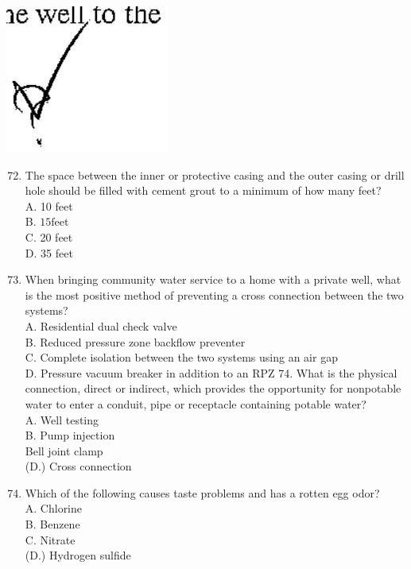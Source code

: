 \documentclass[10pt]{article}
\begin{document}
\includegraphics[max width=\textwidth]{2022_11_11_6852287475e47d0e3aceg-10}

\begin{enumerate}
  \setcounter{enumi}{71}
  \item The space between the inner or protective casing and the outer casing or drill hole should be filled with cement grout to a minimum of how many feet?\\
A. 10 feet\\
B. $15 \mathrm{feet}$\\
C. 20 feet\\
D. 35 feet

  \item When bringing community water service to a home with a private well, what is the most positive method of preventing a cross connection between the two systems?\\
A. Residential dual check valve\\
B. Reduced pressure zone backflow preventer\\
C. Complete isolation between the two systems using an air gap\\
D. Pressure vacuum breaker in addition to an $\mathrm{RPZ}$ 74. What is the physical connection, direct or indirect, which provides the opportunity for nonpotable water to enter a conduit, pipe or receptacle containing potable water?\\
A. Well testing\\
B. Pump injection\\
Bell joint clamp\\
(D.) Cross connection

  \item Which of the following causes taste problems and has a rotten egg odor?\\
A. Chlorine\\
B. Benzene\\
C. Nitrate\\
(D.) Hydrogen sulfide

\end{enumerate}
\end{document}
